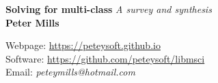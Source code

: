 \documentclass[a0,landscape]{a0poster}
\begin{document}
\begin{minipage}[b]{0.55\linewidth}
\veryHuge \textbf{Solving for multi-class}  %
\Huge\textit{A survey and synthesis}\\[1cm] %
\huge \textbf{Peter Mills}\\ %
\end{minipage}
%
\begin{minipage}[b]{0.25\linewidth}
	{\large 
		Webpage:	\url{https://peteysoft.github.io}\\
		Software:	\url{https://github.com/peteysoft/libmsci}\\
		Email:		\textit{peteymills@hotmail.com}\\ %
	}
\end{minipage}

\vspace{1cm}
\end{document}
